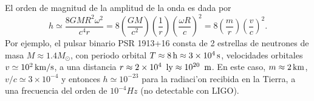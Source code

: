 El orden de magnitud de la amplitud de la onda es dada por
\begin{equation}
 h\simeq\frac{8GMR^2\omega^2}{c^4r}=8\left( \frac{GM}{c^2}\right) \left( \frac{1}{r}\right) \left( \frac{\omega R}{c}\right)^2 =8\left( \frac{m}{r}\right) \left( \frac{v}{c}\right) ^2.
\end{equation}
Por ejemplo, el pulsar binario PSR 1913+16 consta de 2 estrellas de neutrones de masa $M\approx 1.4 M_\odot$, con periodo orbital $T\approx 8\text{\,h}\approx 3\times 10^4\text{\,s}$, velocidades orbitales $v\simeq 10^2\text{\,km/s}$, a una distancia $r\approx 2\times 10^4\text{\, ly}\approx 10^{20}\text{\, m}$. En este caso, $m\approx 2\text{\,km}$, $v/c\simeq 3\times 10^{-4}$ y entonces $h\simeq 10^{-23}$ para la radiaci'on recibida en la Tierra, a una frecuencia del orden de $10^{-4}Hz$ (no detectable con LIGO).





